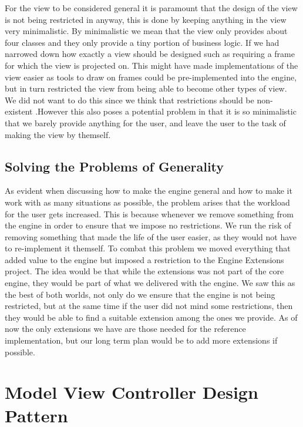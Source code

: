 For the view to be considered general it is paramount that the design
of the view is not being restricted in anyway, this is done by keeping
anything in the view very minimalistic. By minimalistic we mean that
the view only provides about four classes and they only provide a
tiny portion of business logic. If we had narrowed down how exactly
a view should be designed such as requiring a frame for which the
view is projected on. This might have made implementations of the
view easier as tools to draw on frames could be pre-implemented into
the engine, but in turn restricted the view from being able to become
other types of view. We did not want to do this since we think that
restrictions should be non-existent .However this also poses a potential
problem in that it is so minimalistic that we barely provide anything
for the user, and leave the user to the task of making the view by
themself.


\subsection*{Solving the Problems of Generality}

As evident when discussing how to make the engine general and how
to make it work with as many situations as possible, the problem arises
that the workload for the user gets increased. This is because whenever
we remove something from the engine in order to ensure that we impose
no restrictions. We run the risk of removing something that made the
life of the user easier, as they would not have to re-implement it
themself. To combat this problem we moved everything that added value
to the engine but imposed a restriction to the Engine Extensions project.
The idea would be that while the extensions was not part of the core
engine, they would be part of what we delivered with the engine. We
saw this as the best of both worlds, not only do we ensure that the
engine is not being restricted, but at the same time if the user did
not mind some restrictions, then they would be able to find a suitable
extension among the ones we provide. As of now the only extensions
we have are those needed for the reference implementation, but our
long term plan would be to add more extensions if possible.


\section{Model View Controller Design Pattern}

